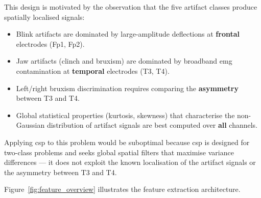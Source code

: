 This design is motivated by the observation that the five
artifact classes produce spatially localised signals:

\begin{itemize}[leftmargin=*]
    \item Blink artifacts are dominated by large-amplitude
    deflections at \textbf{frontal} electrodes (Fp1, Fp2).
    \item Jaw artifacts (clinch and bruxism) are dominated by
    broadband \acrshort{emg} contamination at \textbf{temporal}
    electrodes (T3, T4).
    \item Left/right bruxism discrimination requires comparing
    the \textbf{asymmetry} between T3 and T4.
    \item Global statistical properties (kurtosis, skewness)
    that characterise the non-Gaussian distribution of artifact
    signals are best computed over \textbf{all} channels.
\end{itemize}

Applying \acrshort{csp} to this problem would be suboptimal
because \acrshort{csp} is designed for two-class problems and
seeks global spatial filters that maximise variance differences
— it does not exploit the known localisation of the artifact
signals or the asymmetry between T3 and T4.

Figure~\ref{fig:feature_overview} illustrates the feature
extraction architecture.

